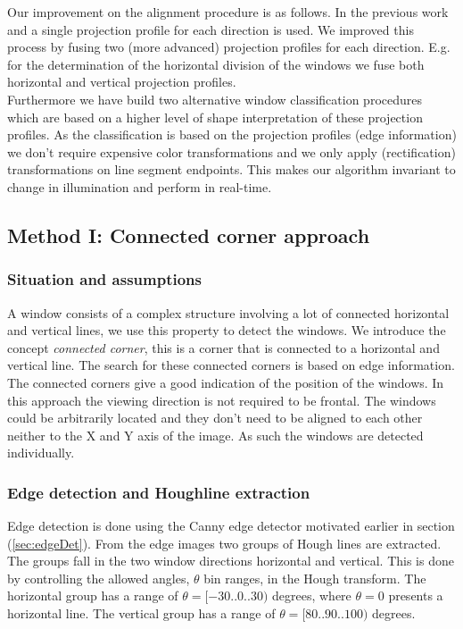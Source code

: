 Our improvement on the alignment procedure is as follows.
In the previous work \cite{Recky_kmeans} and \cite{Lee_extraction} 
a single projection profile for each direction is used.  We improved this 
process by fusing two (more advanced) projection profiles for each direction.
E.g. for the determination of the horizontal division of the windows we fuse both
horizontal and vertical projection profiles.\\

Furthermore we have build two alternative window classification procedures which are 
based on a higher level of shape interpretation of these projection profiles.
As the classification is based on the projection profiles (edge information) we
don't require expensive color transformations and we only apply (rectification)
transformations on line segment endpoints. This makes our algorithm invariant to
change in illumination and perform in real-time.  
	










\subsection{Method I: Connected corner approach} 
\subsubsection{Situation and assumptions}
A window consists of a complex structure involving a lot of connected horizontal
and vertical lines, we use this property to detect the windows. 
We introduce the concept \emph{connected corner}, this is a corner that is 
connected to a horizontal and vertical line.  
The search for these connected corners is based on edge information.
The connected corners give a good indication of the position of the windows. 
In this approach the viewing direction is not required to be frontal.
The windows could be arbitrarily located and they don't need
to be aligned to each other neither to the X and Y axis of the image.
As such the windows are detected individually.

\subsubsection{Edge detection and Houghline extraction}
Edge detection is done using the Canny edge detector motivated earlier in
section (\ref{sec:edgeDet}).
From the edge images two groups of Hough lines are extracted. 
The groups fall in the two window directions horizontal and vertical.
This is done by controlling the allowed angles, $\theta$ bin ranges, in the Hough transform.
The horizontal group has a range of $\theta = [-30..0..30)$ degrees, where $\theta = 0$ presents a horizontal line. 
The vertical group has a range of $\theta = [80..90..100)$ degrees. 

